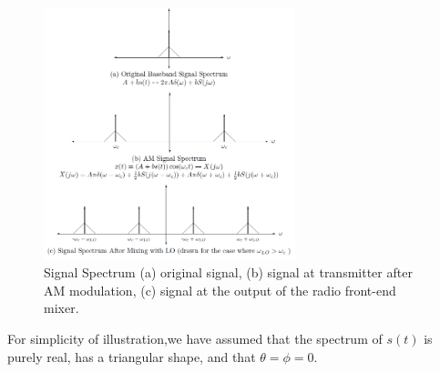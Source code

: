 \documentclass [utf8] {article}
\begin{document}
{	\begin{figure}[H]
		\begin{small}
			\begin{center}
				\includegraphics[width=0.65\textwidth]{figures/Figure7.png}
			\end{center}
			\caption{Signal Spectrum (a) original signal, (b) signal at transmitter after AM modulation, (c) signal at the output of the radio front-end mixer.}
			\label{fig:spectrum}
		\end{small}
	\end{figure}
	
	For simplicity of illustration,we have assumed that the spectrum of $s(t)$ is purely real, has a triangular shape, and that $\theta = \phi = 0$.
}
\end{document}
